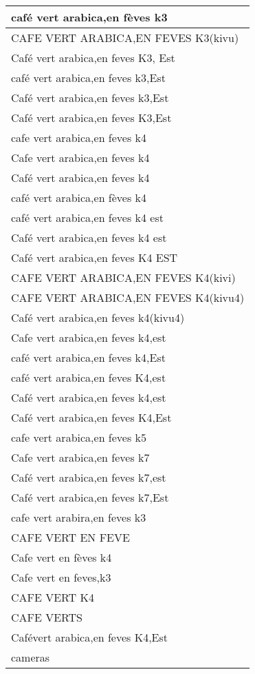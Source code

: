 \documentclass[
]{book}
\begin{document}
\begin{table}
\begin{tabular}[t]{l}
\hline
café vert arabica,en fèves k3\\
\hline
CAFE VERT ARABICA,EN FEVES K3(kivu)\\
\hline
Café vert arabica,en feves K3, Est\\
\hline
café vert arabica,en feves k3,Est\\
\hline
Café vert arabica,en feves k3,Est\\
\hline
Café vert arabica,en feves K3,Est\\
\hline
cafe vert arabica,en feves k4\\
\hline
Cafe vert arabica,en feves k4\\
\hline
Café vert arabica,en feves k4\\
\hline
café vert arabica,en fèves k4\\
\hline
café vert arabica,en feves k4 est\\
\hline
Café vert arabica,en feves k4 est\\
\hline
Café vert arabica,en feves K4 EST\\
\hline
CAFE VERT ARABICA,EN FEVES K4(kivi)\\
\hline
CAFE VERT ARABICA,EN FEVES K4(kivu4)\\
\hline
Café vert arabica,en feves k4(kivu4)\\
\hline
Cafe vert arabica,en feves k4,est\\
\hline
café vert arabica,en feves k4,Est\\
\hline
café vert arabica,en feves K4,est\\
\hline
Café vert arabica,en feves k4,est\\
\hline
Café vert arabica,en feves K4,Est\\
\hline
cafe vert arabica,en feves k5\\
\hline
Cafe vert arabica,en feves k7\\
\hline
Café vert arabica,en feves k7,est\\
\hline
Café vert arabica,en feves k7,Est\\
\hline
cafe vert arabira,en feves k3\\
\hline
CAFE VERT EN FEVE\\
\hline
Cafe vert en fèves k4\\
\hline
Cafe vert en feves,k3\\
\hline
CAFE VERT K4\\
\hline
CAFE VERTS\\
\hline
Cafévert arabica,en feves K4,Est\\
\hline
cameras\\

\end{tabular}
\end{table}
\end{document}
